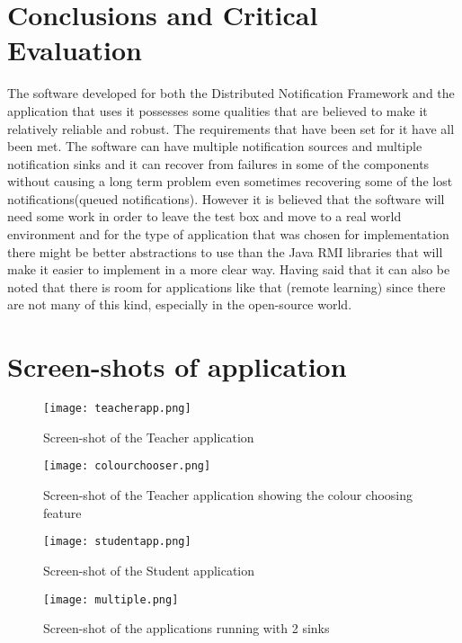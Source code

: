 \documentclass[a4paper,12pt,titlepage]{article}
\begin{document}
\section{Conclusions and Critical Evaluation}
The software developed for both the Distributed Notification Framework and the application that uses it possesses some qualities that are believed to make it relatively reliable and robust. The requirements that have been set for it have all been met. The software can have multiple notification sources and multiple notification sinks and it can recover from failures in some of the components without causing a long term problem even sometimes recovering some of the lost notifications(queued notifications). However it is believed that the software will need some work in order to leave the test box and move to a real world environment and for the type of application that was chosen for implementation there might be better abstractions to use than the Java RMI libraries that will make it easier to implement in a more clear way. Having said that it can also be noted that there is room for applications like that (remote learning) since there are not many of this kind, especially in the open-source world.
\appendix
\section{Screen-shots of application}
\begin{figure}[h!]
  \centering
 \texttt{[image: teacherapp.png]}
\caption{Screen-shot of the Teacher application}
\end{figure}
\begin{figure}[h!]
  \centering
 \texttt{[image: colourchooser.png]}
\caption{Screen-shot of the Teacher application showing the colour choosing feature}
\end{figure}
\begin{figure}[h!]
  \centering
 \texttt{[image: studentapp.png]}
\caption{Screen-shot of the Student application}
\end{figure}
\begin{figure}[h!]
  \centering
 \texttt{[image: multiple.png]}
\caption{Screen-shot of the applications running with 2 sinks}
\end{figure}
\end{document}
